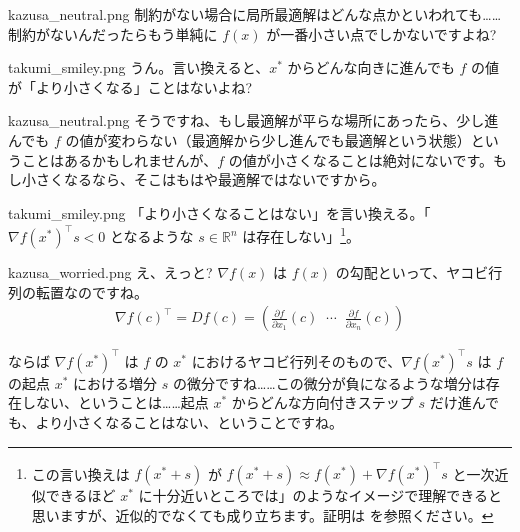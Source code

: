 \documentclass[b5paper,xelatex,ja=standard,10pt]{bxjsarticle}
\begin{document}
\begin{SERIFU}[colback=PaleIris, colbacktitle=PaleIris2]{kazusa_neutral.png}
制約がない場合に局所最適解はどんな点かといわれても……制約がないんだったらもう単純に $f(x)$ が一番小さい点でしかないですよね?
\end{SERIFU}

\begin{SERIFU}[colback=PaleGold, colbacktitle=PaleGold2]{takumi_smiley.png}
うん。言い換えると、$x^\ast$ からどんな向きに進んでも $f$ の値が「より小さくなる」ことはないよね?
\end{SERIFU}

\begin{SERIFU}[colback=PaleIris, colbacktitle=PaleIris2]{kazusa_neutral.png}
そうですね、もし最適解が平らな場所にあったら、少し進んでも $f$ の値が変わらない（最適解から少し進んでも最適解という状態）ということはあるかもしれませんが、$f$ の値が小さくなることは絶対にないです。もし小さくなるなら、そこはもはや最適解ではないですから。
\end{SERIFU}

\begin{SERIFU}[colback=PaleGold, colbacktitle=PaleGold2]{takumi_smiley.png}
「より小さくなることはない」を言い換える。「 $ \nabla f(x^\ast)^\top s < 0$ となるような $s \in \mathbb{R}^n$ は存在しない」\footnote{この言い換えは $f(x^\ast + s)$ が $f(x^\ast + s) \approx f(x^\ast) + \nabla f(x^\ast)^\top s$ と一次近似できるほど $x^\ast$ に十分近いところでは」のようなイメージで理解できると思いますが、近似的でなくても成り立ちます。証明は \cite{zenn} を参照ください。}。
\end{SERIFU}

\begin{SERIFU}[colback=PaleIris, colbacktitle=PaleIris2]{kazusa_worried.png}
え、えっと? $\nabla f(x)$ は $f(x)$ の勾配といって、ヤコビ行列の転置なのですね。
\begin{eqnarray*}
\nabla f(c)^\top = Df(c) = \displaystyle \left( \frac{\partial f}{\partial x_1}(c) \;\; \cdots \;\; \frac{\partial f}{\partial x_n}(c) \right)
\end{eqnarray*}

ならば $\nabla f(x^\ast)^\top$ は $f$ の $x^\ast$ におけるヤコビ行列そのもので、$\nabla f(x^\ast)^\top s$ は $f$ の起点 $x^\ast$ における増分 $s$ の微分ですね……この微分が負になるような増分は存在しない、ということは……起点 $x^\ast$ からどんな方向付きステップ $s$ だけ進んでも、より小さくなることはない、ということですね。
\end{SERIFU}
\end{document}
